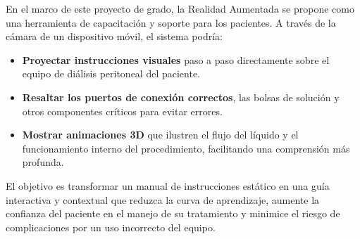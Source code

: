 \documentclass{article}
\begin{document}
En el marco de este proyecto de grado, la Realidad Aumentada se propone como una herramienta de capacitación y soporte para los pacientes. A través de la cámara de un dispositivo móvil, el sistema podría:

\begin{itemize}
    \item \textbf{Proyectar instrucciones visuales} paso a paso directamente sobre el equipo de diálisis peritoneal del paciente.
    \item \textbf{Resaltar los puertos de conexión correctos}, las bolsas de solución y otros componentes críticos para evitar errores.
    \item \textbf{Mostrar animaciones 3D} que ilustren el flujo del líquido y el funcionamiento interno del procedimiento, facilitando una comprensión más profunda.
\end{itemize}

El objetivo es transformar un manual de instrucciones estático en una guía interactiva y contextual que reduzca la curva de aprendizaje, aumente la confianza del paciente en el manejo de su tratamiento y minimice el riesgo de complicaciones por un uso incorrecto del equipo.
\end{document}
